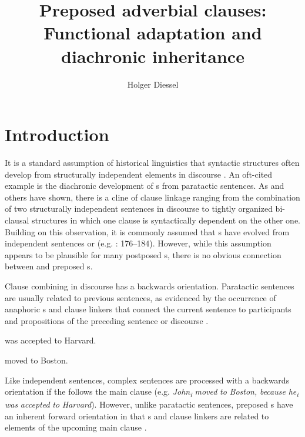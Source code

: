 \documentclass[output=paper]{langsci/langscibook}
\author{Holger Diessel\affiliation{University of Jena}}
\title{Preposed adverbial clauses: Functional adaptation and diachronic inheritance}
\begin{document}
\maketitle 

\section{Introduction}

It is a standard assumption of historical linguistics that syntactic structures often develop from structurally independent elements in discourse \citep{Givón1979}. An oft-cited example is the diachronic development of s from paratactic sentences. As \citet{Lehmann1988} and others have shown, there is a cline of clause linkage ranging from the combination of two structurally independent sentences in discourse to tightly organized bi-clausal structures in which one clause is syntactically dependent on the other one. Building on this observation, it is commonly assumed that s have evolved from independent sentences or  (e.g. \citealt{HopperTraugott2003}: 176--184). However, while this assumption appears to be plausible for many postposed s, there is no obvious connection between  and preposed s.

Clause combining in discourse has a backwards orientation. Paratactic sentences are usually related to previous sentences, as evidenced by the occurrence of anaphoric s and clause linkers that connect the current sentence to participants and propositions of the preceding sentence or discourse .
 

\ea%
\label{ex:diessel:1}
 was accepted to Harvard.  \textit{} moved to Boston.
\z


Like independent sentences, complex sentences are processed with a backwards orientation if the  follows the main clause (e.g. \textit{John\textsubscript{i}} \textit{moved} \textit{to} \textit{Boston,} \textit{because} \textit{he\textsubscript{i}} \textit{was} \textit{accepted} \textit{to} \textit{Harvard}). However, unlike paratactic sentences, preposed s have an inherent forward orientation in that s and clause linkers are related to elements of the upcoming main clause .
\end{document}
